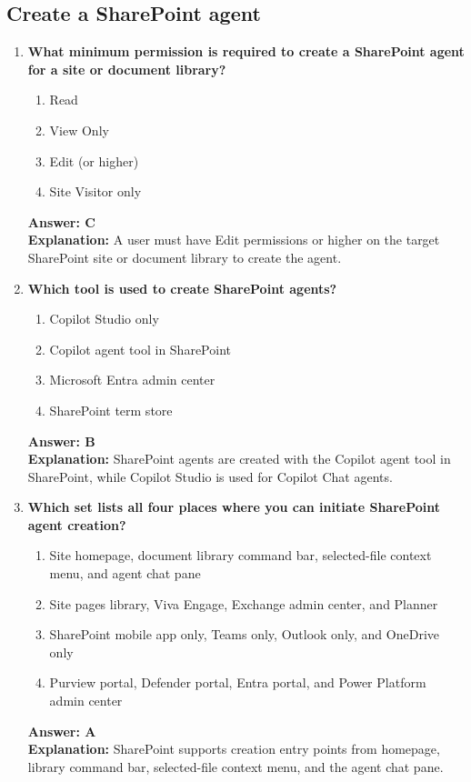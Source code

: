 \documentclass[10pt]{article}
\begin{document}
\subsection{Create a SharePoint agent}
\begin{enumerate}[leftmargin=*]

\item \textbf{What minimum permission is required to create a SharePoint agent for a site or document library?}
\begin{enumerate}[label=\Alph*.]
  \item Read
  \item View Only
  \item Edit (or higher)
  \item Site Visitor only
\end{enumerate}
\textbf{Answer: C}\\
\textbf{Explanation:} A user must have Edit permissions or higher on the target SharePoint site or document library to create the agent.

\item \textbf{Which tool is used to create SharePoint agents?}
\begin{enumerate}[label=\Alph*.]
  \item Copilot Studio only
  \item Copilot agent tool in SharePoint
  \item Microsoft Entra admin center
  \item SharePoint term store
\end{enumerate}
\textbf{Answer: B}\\
\textbf{Explanation:} SharePoint agents are created with the Copilot agent tool in SharePoint, while Copilot Studio is used for Copilot Chat agents.

\item \textbf{Which set lists all four places where you can initiate SharePoint agent creation?}
\begin{enumerate}[label=\Alph*.]
  \item Site homepage, document library command bar, selected-file context menu, and agent chat pane
  \item Site pages library, Viva Engage, Exchange admin center, and Planner
  \item SharePoint mobile app only, Teams only, Outlook only, and OneDrive only
  \item Purview portal, Defender portal, Entra portal, and Power Platform admin center
\end{enumerate}
\textbf{Answer: A}\\
\textbf{Explanation:} SharePoint supports creation entry points from homepage, library command bar, selected-file context menu, and the agent chat pane.


\end{enumerate}
\end{document}
